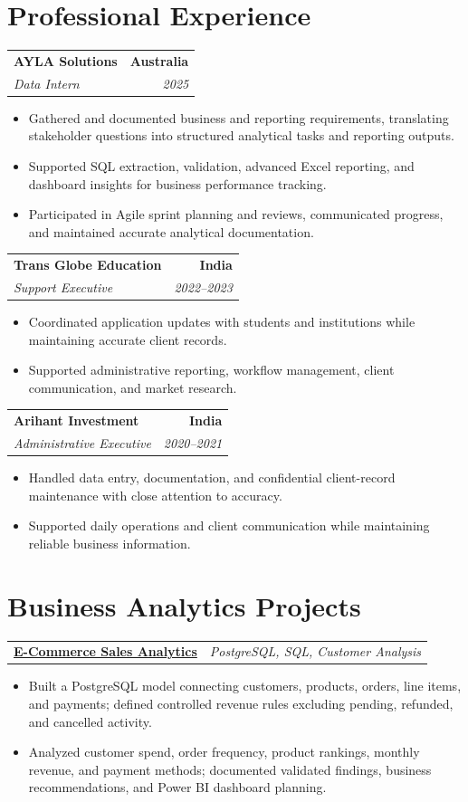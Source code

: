 \documentclass[letterpaper,10pt]{article}
\makeatletter
\newcommand{\role}[4]{%
  \begin{tabularx}{\textwidth}{@{}Xr@{}}
    \textbf{#1} & \textbf{#2} \\
    \textit{#3} & \textit{#4}
  \end{tabularx}\vspace{-1pt}
}
\newcommand{\project}[2]{%
  \begin{tabularx}{\textwidth}{@{}Xr@{}}
    \textbf{#1} & \textit{#2}
  \end{tabularx}\vspace{-1pt}
}
\makeatother
\begin{document}
\section{Professional Experience}
\role{AYLA Solutions}{Australia}{Data Intern}{2025}
\begin{itemize}
  \item Gathered and documented business and reporting requirements, translating stakeholder questions into structured analytical tasks and reporting outputs.
  \item Supported SQL extraction, validation, advanced Excel reporting, and dashboard insights for business performance tracking.
  \item Participated in Agile sprint planning and reviews, communicated progress, and maintained accurate analytical documentation.
\end{itemize}
\vspace{1pt}

\role{Trans Globe Education}{India}{Support Executive}{2022--2023}
\begin{itemize}
  \item Coordinated application updates with students and institutions while maintaining accurate client records.
  \item Supported administrative reporting, workflow management, client communication, and market research.
\end{itemize}
\vspace{1pt}

\role{Arihant Investment}{India}{Administrative Executive}{2020--2021}
\begin{itemize}
  \item Handled data entry, documentation, and confidential client-record maintenance with close attention to accuracy.
  \item Supported daily operations and client communication while maintaining reliable business information.
\end{itemize}

\section{Business Analytics Projects}
\project{\href{https://github.com/jainalimehta/Ecommerce-Sales-Analytics}{E-Commerce Sales Analytics}}{PostgreSQL, SQL, Customer Analysis}
\begin{itemize}
  \item Built a PostgreSQL model connecting customers, products, orders, line items, and payments; defined controlled revenue rules excluding pending, refunded, and cancelled activity.
  \item Analyzed customer spend, order frequency, product rankings, monthly revenue, and payment methods; documented validated findings, business recommendations, and Power BI dashboard planning.
\end{itemize}
\vspace{1pt}
\end{document}
